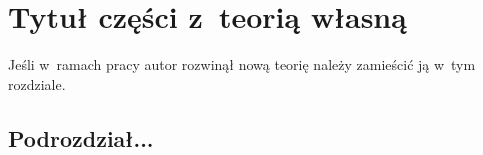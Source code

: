 \chapter{Tytuł części z~teorią własną}\label{chap:nowa_teoria}
Jeśli w~ramach pracy autor rozwinął nową teorię należy zamieścić ją w~tym
rozdziale.

\section{Podrozdział...}
